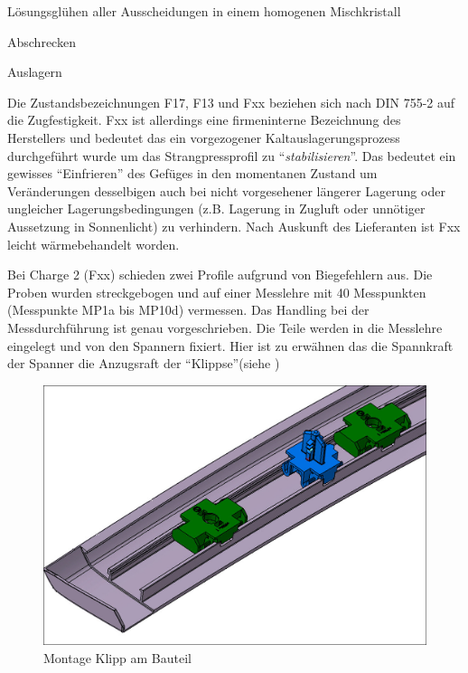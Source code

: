 \documentclass[12pt,a4paper,parskip]{scrartcl}
\begin{document}
\begin{enumerate*}
 \item Lösungsglühen aller Ausscheidungen in einem homogenen Mischkristall 
 \item Abschrecken
 \item Auslagern 
 \end{enumerate*}
 
   
 
 

Die Zustandsbezeichnungen F17, F13 und Fxx beziehen sich nach DIN 755-2 auf die Zugfestigkeit. Fxx ist allerdings eine firmeninterne Bezeichnung des Herstellers und bedeutet das ein  vorgezogener Kaltauslagerungsprozess durchgeführt wurde um das Strangpressprofil zu "`\emph{stabilisieren}"'. Das bedeutet ein gewisses "`Einfrieren"' des Gefüges in den momentanen Zustand um Veränderungen desselbigen auch bei nicht vorgesehener längerer Lagerung oder ungleicher Lagerungsbedingungen (z.B. Lagerung in Zugluft oder unnötiger Aussetzung in Sonnenlicht) zu verhindern. Nach Auskunft des Lieferanten ist Fxx leicht wärmebehandelt worden.


 Bei Charge 2 (Fxx) schieden zwei Profile aufgrund von Biegefehlern aus. Die Proben wurden streckgebogen und auf einer Messlehre  mit 40 Messpunkten (Messpunkte MP1a bis MP10d) vermessen. Das Handling bei der Messdurchführung ist genau vorgeschrieben. Die Teile werden in die Messlehre eingelegt und von den Spannern fixiert. Hier ist zu erwähnen das die Spannkraft der Spanner die Anzugsraft der "`Klippse"'(siehe )
 \begin{figure}[H]
 \centering
 \includegraphics[width=.8\textwidth]{klip}
 \caption{Montage Klipp am Bauteil}
 \label{fig:klip}
 \end{figure}
 
\end{document}
